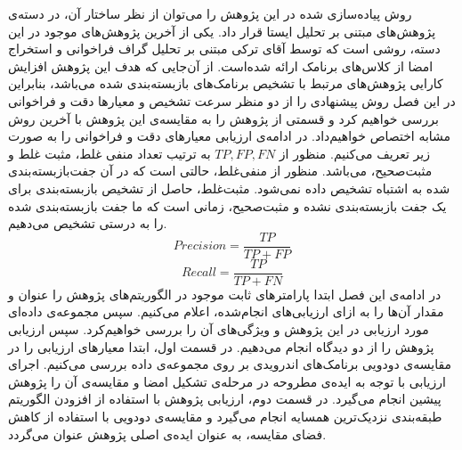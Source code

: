
\label{result}
روش پیاده‌سازی شده در این پژوهش را می‌توان از نظر ساختار آن، در دسته‌ی پژوهش‌های مبتنی بر تحلیل ایستا قرار داد. یکی از آخرین پژوهش‌های موجود در این دسته، روشی است که توسط آقای ترکی مبتنی بر تحلیل گراف فراخوانی و استخراج امضا از کلاس‌های برنامک ارائه شده‌است. از آن‌جایی که هدف این پژوهش افزایش کارایی پژوهش‌های مرتبط با تشخیص برنامک‌های بازبسته‌بندی شده می‌باشد، بنابراین در این فصل روش پیشنهادی را از دو منظر سرعت تشخیص و معیار‌ها دقت و فراخوانی بررسی خواهیم کرد و قسمتی از پژوهش را به مقایسه‌ی این پژوهش با آخرین روش مشابه اختصاص خواهیم‌داد. در ادامه‌ی ارزیابی معیار‌های دقت و فراخوانی را به صورت زیر تعریف می‌کنیم. منظور از $TP,FP,FN$ به ترتیب تعداد منفی‌ غلط، مثبت غلط و مثبت‌صحیح، می‌باشد. منظور از منفی‌غلط، حالتی است که در آن جفت‌بازبسته‌بندی شده به اشتباه تشخیص داده‌ نمی‌شود. مثبت‌غلط، حاصل از تشخیص بازبسته‌بندی برای یک جفت بازبسته‌بندی نشده و مثبت‌صحیح، زمانی است که ما جفت بازبسته‌بندی شده را به درستی تشخیص می‌دهیم.
\begin{equation}
	‫‪Precision‬‬	= \frac{TP}{TP+FP}
\end{equation}
\begin{equation}
		Recall = \frac{TP}{TP+FN}
\end{equation}
در ادامه‌ی این فصل ابتدا پارامتر‌های ثابت موجود در الگوریتم‌های پژوهش را عنوان و مقدار آن‌ها را به ازا‌ی ارزیابی‌های انجام‌شده، اعلام می‌کنیم. سپس مجموعه‌‌ی داده‌ای مورد ارزیابی در این پژوهش و ویژگی‌های آن را بررسی خواهیم‌کرد. سپس ارزیابی پژوهش را از دو دیدگاه انجام می‌دهیم. در قسمت اول، ابتدا معیار‌های ارزیابی را در مقایسه‌ی دودویی برنامک‌های اندرویدی بر روی مجموعه‌ی داده بررسی می‌کنیم. اجرای ارزیابی با توجه به ایده‌ی مطروحه در مرحله‌ی تشکیل امضا و مقایسه‌ی آن را پژوهش پیشین انجام می‌گیرد. در قسمت دوم، ارزیابی پژوهش با استفاده از افزودن الگوریتم‌ طبقه‌بندی نزدیک‌ترین همسایه انجام می‌گیرد و مقایسه‌ی دودویی با استفاده از کاهش فضای مقایسه‌، به عنوان ایده‌ی اصلی پژوهش عنوان می‌گردد.

